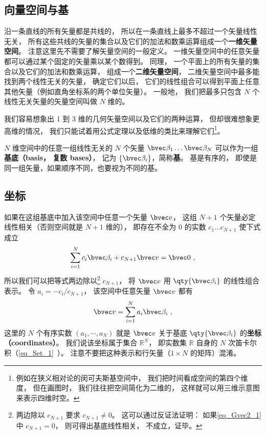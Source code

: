 \subsection{向量空间与基}
沿一条直线的所有矢量都是共线的， 所以在一条直线上最多不超过一个矢量线性无关， 所有这些共线的矢量的集合以及它们的加法和数乘运算组成一个\textbf{一维矢量空间}。 注意这里先不需要了解矢量空间的一般定义。 一维矢量空间中的任意矢量都可以通过某个固定的矢量乘以某个数得到。 同理， 一个平面上的所有矢量的集合以及它们的加法和数乘运算， 组成一个\textbf{二维矢量空间}， 二维矢量空间中最多能找到两个线性无关的矢量， 确定它们以后， 它们的线性组合可以得到平面上任意其他矢量（例如直角坐标系的两个单位矢量）。 一般地， 我们把最多只包含 $N$ 个线性无关矢量的矢量空间叫做 $N$ 维的。

我们容易想象出 1 到 3 维的几何矢量空间以及它们的两种运算， 但却很难想象更高维的情况， 我们只能试着用公式定理以及低维的类比来理解它们\footnote{例如在狭义相对论的闵可夫斯基空间中， 我们把时间看成空间的第四个维度， 但在画图时， 我们往往把空间简化为二维的， 这样就可以用三维示意图来表示四维时空。}。

$N$ 维空间中的任意一组线性无关的 $N$ 个矢量 $\bvec \beta_1\dots \bvec \beta_N$ 可以作为一组\textbf{基底（basis， 复数 bases）}， 记为 $\{\bvec \beta_i\}$，简称\textbf{基}。 基是有序的， 即使是同一组矢量，如果顺序不同，也要视为不同的基。

\subsection{坐标}
如果在这组基底中加入该空间中任意一个矢量 $\bvec v$， 这组 $N+1$ 个矢量必定线性相关（否则空间就是 $N+1$ 维的）， 即存在不全为 0 的实数 $c_1\dots c_{N+1}$ 使下式成立
\begin{equation}\label{eq_Gvec2_1}
\sum_{i=1}^{N} c_i \bvec \beta_i + c_{N+1} \bvec v = \bvec 0~,
\end{equation}
所以我们可以把等式两边除以\footnote{两边除以 $c_{N+1}$ 要求 $c_{N+1} \ne 0$。 这可以通过反证法证明： 如果\autoref{eq_Gvec2_1} 中 $c_{N+1} = 0$， 则可得出基底线性相关， 不成立，证毕。} $c_{N+1}$， 将 $\bvec v$ 用 $\qty{\bvec \beta_i}$ 的线性组合表示。 令 $a_i = -c_i/c_{N+1}$， 该空间中任意矢量 $\bvec v$ 都有
\begin{equation}\label{eq_Gvec2_5}
\bvec v = \sum_{i=1}^N a_i \bvec \beta_i~,
\end{equation}
这里的 $N$ 个有序实数 $(a_1, \cdots, a_N)$ 就是 $\bvec v$ 关于基底 $\qty{\bvec \beta_i}$ 的\textbf{坐标（coordinates）}。 我们说该坐标属于集合 $\mathbb R^N$， 即实数集 $\mathbb R$ 自身的 $N$ 次笛卡尔积（\autoref{eq_Set_1}~）。 注意不要把这种表示和行矢量（$1\times N$ 的矩阵）混淆。


